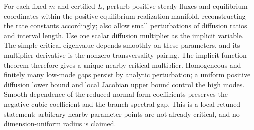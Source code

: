 For each fixed $m$ and certified $L$, perturb positive steady fluxes and
equilibrium coordinates within the positive-equilibrium realization manifold,
reconstructing the rate constants accordingly; also allow small perturbations
of diffusion ratios and interval length.  Use one scalar diffusion multiplier
as the implicit variable.  The simple critical eigenvalue depends smoothly on
these parameters, and its multiplier derivative is the nonzero transversality
pairing.  The implicit-function theorem therefore gives a unique nearby
critical multiplier.  Homogeneous and finitely many low-mode gaps persist by
analytic perturbation; a uniform positive diffusion lower bound and local
Jacobian upper bound control the high modes.  Smooth dependence of the
reduced normal-form coefficients preserves the negative cubic coefficient and
the branch spectral gap.  This is a local retuned statement: arbitrary nearby
parameter points are not already critical, and no dimension-uniform radius is
claimed.
